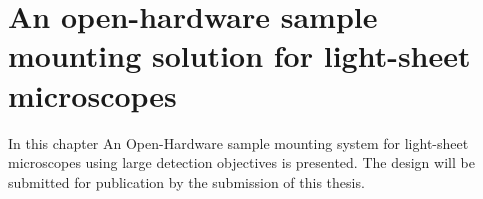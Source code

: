 \ifpdf
    \graphicspath{{Chapters/chamber/Figs/Raster/}{Chapters/chamber/Figs/PDF/}{Chapters/chamber/Figs/}}
\else
    \graphicspath{{Chapters/chamber/Figs/Vector/}{Chapters/chamber/Figs/}}
\fi


\chapter{An open-hardware sample mounting solution for light-sheet microscopes}\label{chapter:chamber}

 In this chapter An Open-Hardware sample mounting system for light-sheet microscopes using large detection objectives is presented.
 The design will be submitted for publication by the submission of this thesis.

